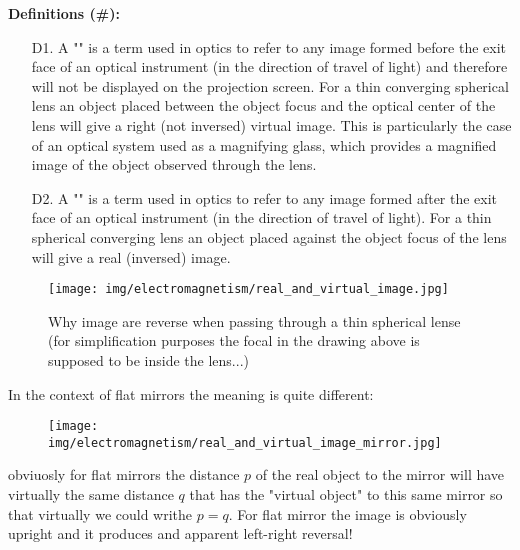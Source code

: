 	\textbf{Definitions (\#\mydef):}
	\begin{enumerate}
		\item[D1.] A "" is a term used in optics to refer to any image formed before the exit face of an optical instrument (in the direction of travel of light) and therefore will not be displayed on the projection screen. For a thin converging spherical lens an object placed between the object focus and the optical center of the lens will give a right (not inversed) virtual image. This is particularly the case of an optical system used as a magnifying glass, which provides a magnified image of the object observed through the lens.

		\item[D2.] A "" is a term used in optics to refer to any image formed after the exit face of an optical instrument (in the direction of travel of light). For a thin spherical converging lens an object placed against the object focus of the lens will give a real (inversed) image.
	\end{enumerate}
	\begin{figure}[H]
		\centering
		\texttt{[image: img/electromagnetism/real\_and\_virtual\_image.jpg]}
		\caption{Why image are reverse when passing through a thin spherical lense (for simplification purposes the focal in the drawing above is supposed to be inside the lens...)}
	\end{figure}
	In the context of flat mirrors the meaning is quite different:
	\begin{figure}[H]
		\centering
		\texttt{[image: img/electromagnetism/real\_and\_virtual\_image\_mirror.jpg]}
	\end{figure}
	obviuosly for flat mirrors the distance $p$ of the real object to the mirror will have virtually the same distance $q$ that has the "virtual object" to this same mirror so that virtually we could writhe $p=q$. For flat mirror the image is obviously upright and it produces and apparent left-right reversal!
	
